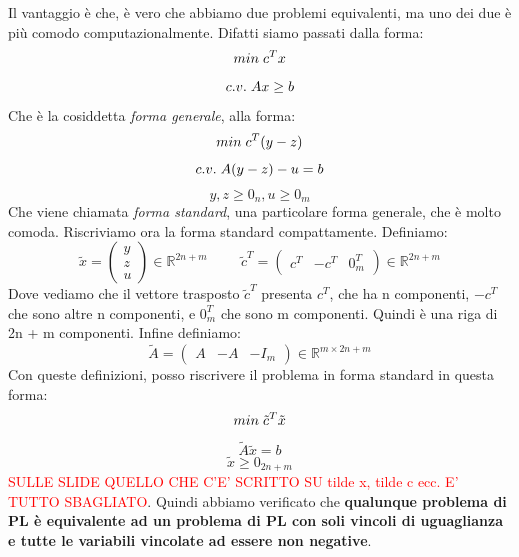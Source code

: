 Il vantaggio è che, è vero che abbiamo due problemi equivalenti, ma uno dei due è più comodo computazionalmente. Difatti siamo passati dalla forma:
\begin{equation*}
    min \hspace{0.1cm} c^Tx
\end{equation*}
\begin{equation*}
    c.v. \hspace{0.1cm} Ax \geq b
\end{equation*}
Che è la cosiddetta \textit{forma generale}, alla forma:
\begin{equation*}
    min \hspace{0.1cm} c^T(y-z)
\end{equation*}
\begin{equation*}
    c.v. \hspace{0.1cm} A(y-z) - u = b
\end{equation*}
\begin{equation*}
    y,z \geq 0_n, u \geq 0_m
\end{equation*}
Che viene chiamata \textit{forma standard}, una particolare forma generale, che è molto comoda. Riscriviamo ora la forma standard compattamente. Definiamo:
\begin{equation*}
    \tilde{x} = \begin{pmatrix}
        y\\
        z\\
        u
    \end{pmatrix} \in \mathbb{R}^{2n + m} \hspace{1cm} \tilde{c}^T = \begin{pmatrix}
        c^T & -c^T & 0_m^T
    \end{pmatrix} \in \mathbb{R}^{2n+m}
\end{equation*}
Dove vediamo che il vettore trasposto $\tilde{c}^T$ presenta $c^T$, che ha n componenti, $-c^T$ che sono altre n componenti, e $0_m^T$ che sono m componenti. Quindi è una riga di 2n + m componenti. Infine definiamo:
\begin{equation*}
    \tilde{A} = \begin{pmatrix}
        A & -A & -I_m
        \end{pmatrix} \in \mathbb{R}^{m \times 2n + m}
\end{equation*}
Con queste definizioni, posso riscrivere il problema in forma standard in questa forma:
\begin{equation*}
    min \hspace{0.1cm} \tilde{c}^T\tilde{x}
\end{equation*}
\begin{equation*}
    \tilde{A}\tilde{x} = b
\end{equation*}
\begin{equation*}
    \tilde{x} \geq 0_{2n + m}
\end{equation*}
\textcolor{red}{SULLE SLIDE QUELLO CHE C'E' SCRITTO SU tilde x, tilde c ecc. E' TUTTO SBAGLIATO}. Quindi abbiamo verificato che \textbf{qualunque problema di PL è equivalente ad un problema di PL con soli vincoli di uguaglianza e tutte le variabili vincolate ad essere non negative}.




